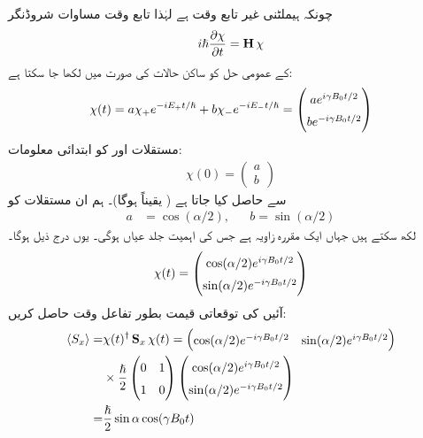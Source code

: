  چونکہ ہیملٹنی غیر تابع وقت ہے لہٰذا تابع وقت مساوات شروڈنگر 
\begin{align}\label{مساوات_تین_ابعادی_شروڈنگر_شائے_روپ}
i \hslash \frac{\partial \chi}{\partial t} = \operatorname{\mathbf{H}} \chi
\end{align}
کے عمومی حل کو ساکن حالات کی صورت میں لکھا جا سکتا ہے:
\begin{align*}
\chi (t) = a \chi_+ e^{- i E_{+} t/\hslash} + b \chi_{-} e^{- i E_{-} t / \hslash} = 
\begin{pmatrix}
\renewcommand{\arraystretch}{1.5}
a e^{i \gamma B_0 t /2} \\
b e^{- i \gamma B_0 t/2}
\end{pmatrix}
\end{align*}
مستقلات  اور  کو ابتدائی معلومات: 
\begin{align*}
\chi (0) = 
\begin{pmatrix}
a \\
b
\end{pmatrix}
\end{align*}
سے حاصل کیا جاتا ہے ( یقیناً  ہوگا)۔ ہم ان مستقلات کو
\begin{align*}
a& = \cos (\alpha/2), && b = \sin (\alpha/2)
\end{align*}
 لکھ سکتے ہیں جہاں  ایک مقررہ زاویہ ہے جس کی اہمیت جلد عیاں ہوگی۔ یوں درج ذیل ہوگا۔
\begin{align}
\renewcommand{\arraystretch}{1.5}
\chi(t) = 
\begin{pmatrix}
\cos (\alpha/2) e^{i \gamma B_0 t/2} \\
\sin (\alpha/2) e^{- i \gamma B_0 t /2}
\end{pmatrix}
\end{align}
آئیں  کی توقعاتی قیمت بطور تفاعل وقت حاصل کریں:
\begin{align}
\langle S_x \rangle =& \chi (t)^{\dagger} \mat{S}_x \chi (t) = 
\begin{pmatrix}
\cos(\alpha/2) e^{- i \gamma B_0 t/2} & \sin(\alpha/2) e^{i \gamma B_0 t/2} 
\end{pmatrix} \nonumber\\
& \times \frac{\hslash}{2}
\begin{pmatrix}
0 & 1 \\
1 & 0
\end{pmatrix}
\begin{pmatrix}
\cos(\alpha /2) e^{i \gamma B_0 t/2} \\
\sin(\alpha/2) e^{- i \gamma B_0 t/2}
\end{pmatrix} \nonumber \\
=& \frac{\hslash}{2} \sin \alpha \cos (\gamma B_0 t) 
\end{align}
